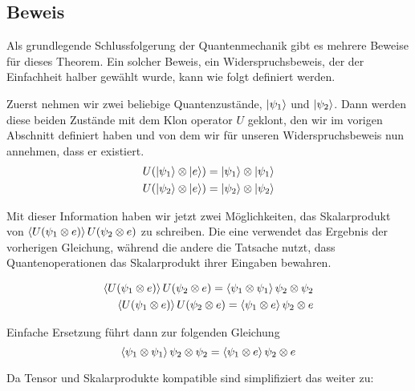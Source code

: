 \subsection{Beweis}\label{subsec:proof}
Als grundlegende Schlussfolgerung der Quantenmechanik gibt es mehrere Beweise für dieses Theorem.
Ein solcher Beweis, ein Widerspruchsbeweis, der der Einfachheit halber gewählt wurde, kann wie folgt definiert werden.

Zuerst nehmen wir zwei beliebige Quantenzustände, $\ket{\psi_1}$ und $\ket{\psi_2}$.
Dann werden diese beiden Zustände mit dem Klon operator $U$ geklont, den wir im vorigen Abschnitt definiert haben
und von dem wir für unseren Widerspruchsbeweis nun annehmen, dass er existiert.
\begin{equation}
\begin{split}
    U(\ket{\psi_1} \otimes \ket{e}) = \ket{\psi_1} \otimes \ket{\psi_1}\\
    U(\ket{\psi_2} \otimes \ket{e}) = \ket{\psi_2} \otimes \ket{\psi_2}
\end{split}\label{eq:clone_two_states}
\end{equation}

Mit dieser Information haben wir jetzt zwei Möglichkeiten, das Skalarprodukt von
$\braket{U(\psi_1 \otimes e)}{U(\psi_2 \otimes e)}$ zu schreiben.
Die eine verwendet das Ergebnis der vorherigen Gleichung, während die andere die Tatsache nutzt,
dass Quantenoperationen das Skalarprodukt ihrer Eingaben bewahren\cite{segal1947postulates}.

\begin{equation}
\begin{split}
    \braket{U(\psi_1 \otimes e)}{U(\psi_2 \otimes e)} = \braket{\psi_1 \otimes \psi_1}{\psi_2 \otimes \psi_2}\\
    \braket{U(\psi_1 \otimes e)}{U(\psi_2 \otimes e)} = \braket{\psi_1 \otimes e}{\psi_2 \otimes e}
\end{split}\label{eq:two_scalar_products}
\end{equation}

Einfache Ersetzung führt dann zur folgenden Gleichung
\begin{equation}
    \braket{\psi_1 \otimes \psi_1}{\psi_2 \otimes \psi_2} =
    \braket{\psi_1 \otimes e}{\psi_2 \otimes e}
\label{eq:tensor_equals}
\end{equation}

Da Tensor und Skalarprodukte kompatible sind\cite{segal1947postulates} simplifiziert das weiter zu:


